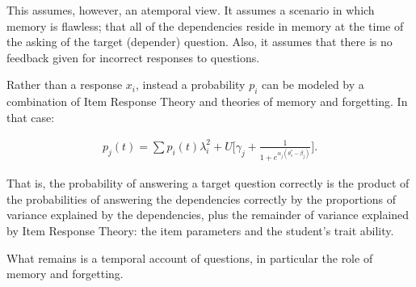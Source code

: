 This assumes, however, an atemporal view.  It assumes a scenario in which
memory is flawless; that all of the dependencies reside in memory at the time
of the asking of the target (depender) question.  Also, it assumes that there
is no feedback given for incorrect responses to questions. 

Rather than a response $x_i$, instead a probability $p_i$ can be modeled by
a combination of Item Response Theory and theories of memory and forgetting.
In that case:

\begin{equation}
 \begin{array}{llll}
  p_j(t) =  \displaystyle\sum p_i(t)\lambda_i^2 + U \Bigg[ \gamma_j + \frac{1}{1 + e^{\alpha_j (\theta_s^{*} - \beta_j)}} \Bigg].
 \end{array}
\end{equation}

That is, the probability of answering a target question correctly is the
product of the probabilities of answering the dependencies correctly by the
proportions of variance explained by the dependencies, plus the remainder of
variance explained by Item Response Theory: the item parameters and the
student's trait ability.  

What remains is a temporal account of questions, in particular the role of
memory and forgetting.

